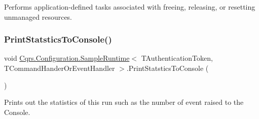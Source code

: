 Performs application-\/defined tasks associated with freeing, releasing, or resetting unmanaged resources. 

\mbox{\label{classCqrs_1_1Configuration_1_1SampleRuntime_a384b1c93c2d856f2d15a7ae410dedee9_a384b1c93c2d856f2d15a7ae410dedee9}} 
\subsubsection{\texorpdfstring{Print\+Statstics\+To\+Console()}{PrintStatsticsToConsole()}}
{\footnotesize\ttfamily void \hyperlink{classCqrs_1_1Configuration_1_1SampleRuntime}{Cqrs.\+Configuration.\+Sample\+Runtime}$<$ T\+Authentication\+Token, T\+Command\+Hander\+Or\+Event\+Handler $>$.Print\+Statstics\+To\+Console (\begin{DoxyParamCaption}{ }\end{DoxyParamCaption})}



Prints out the statistics of this run such as the number of event raised to the Console. 

